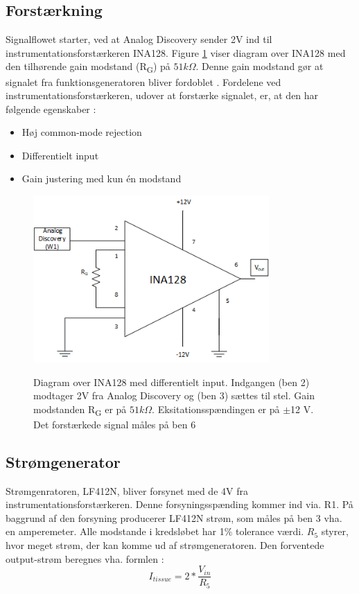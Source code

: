 \subsection{Forstærkning}
Signalflowet starter, ved at Analog Discovery sender 2V ind til instrumentationsforstærkeren INA128. Figure \ref{fig:ina128} viser diagram over INA128 med den tilhørende gain modstand (R\textsubscript{G}) på $ 51k\Omega $. Denne gain modstand gør at signalet fra funktionsgeneratoren bliver fordoblet \citep{TexasInstruments2005}. Fordelene ved instrumentationsforstærkeren, udover at forstærke signalet, er, at den har følgende egenskaber \cite{PeterJohansen2014}:
 
\begin{itemize}
\item Høj common-mode rejection
\item Differentielt input
\item Gain justering med kun én modstand
\end{itemize}


\begin{figure}[H]
\centering
{\includegraphics[width=9cm]
{Figure/ina128}}
\caption{Diagram over INA128 med differentielt input. Indgangen (ben 2) modtager 2V fra Analog Discovery og (ben 3) sættes til stel. Gain modstanden R\textsubscript{G} er på $ 51k\Omega$. Eksitationsspændingen er på $\pm$12 V. Det forstærkede signal måles på ben 6  }
\label{fig:ina128}
\end{figure}



\subsection{Strømgenerator}

Strømgenratoren, LF412N, bliver forsynet med de 4V fra instrumentationsforstærkeren. Denne forsyningsspænding kommer ind via. R1. På baggrund af den forsyning producerer LF412N strøm, som måles på ben 3 vha. en amperemeter. Alle modstande i kredsløbet har 1\% tolerance værdi. $ R_{5} $ styrer, hvor meget strøm, der kan komme ud af strømgeneratoren. Den forventede output-strøm 
beregnes vha. formlen \cite{Aroom2009}: $$I_{tissue}=2*\frac{V_{in}}{R_{5}}$$


